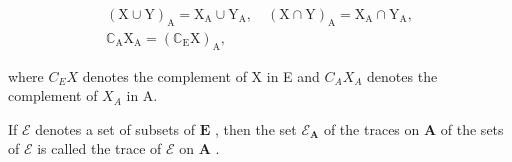 \[
\begin{array}{c} (\mathrm{X} \cup \mathrm{Y}) _ {\mathrm{A}} = \mathrm{X} _ {\mathrm{A}} \cup \mathrm{Y} _ {\mathrm{A}}, \quad (\mathrm{X} \cap \mathrm{Y}) _ {\mathrm{A}} = \mathrm{X} _ {\mathrm{A}} \cap \mathrm{Y} _ {\mathrm{A}}, \\ \mathbb {C} _ {\mathrm{A}} \mathrm{X} _ {\mathrm{A}} = (\mathbb {C} _ {\mathrm{E}} \mathrm{X}) _ {\mathrm{A}}, \end{array}
\]

where \(C_{E}X\) denotes the complement of X in E and \(C_{A}X_{A}\) denotes the complement of \(X_{A}\) in A.

If \(\mathcal{E}\) denotes a set of subsets of \(\mathbf{E}\) , then the set \(\mathcal{E}_{\mathbf{A}}\) of the traces on \(\mathbf{A}\) of the sets of \(\mathcal{E}\) is called the trace of \(\mathcal{E}\) on \(\mathbf{A}\) .

